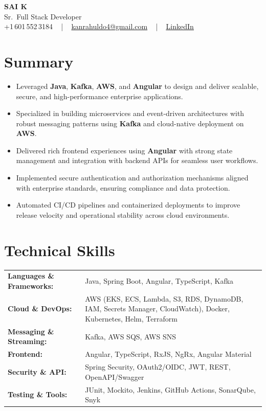 \documentclass[letterpaper,11pt]{article}
\newcommand{\resumeItem}[1]{
  \item\footnotesize{
    {#1 \vspace{-2pt}}
  }
}
\newcommand{\resumeItemListStart}{\begin{itemize}[leftmargin=*]}
\newcommand{\resumeItemListEnd}{\end{itemize}\vspace{-5pt}}
\begin{document}
\begin{center}
    {\fontsize{14pt}{12pt}\selectfont \textbf{\MakeUppercase{Sai K}}}\\ \vspace{2pt}
    \fontsize{10pt}{12pt}\selectfont Sr.\ Full Stack Developer\\ \vspace{2pt}
    \fontsize{10pt}{12pt}\selectfont +1\,601\,552\,3184 ~ | ~
    \href{mailto:kanrahuldo4@gmail.com}{kanrahuldo4@gmail.com} ~ | ~
    \href{https://www.linkedin.com/in/srrrk/}{\color{blue}\underline{LinkedIn}}
    \vspace{-10pt}
\end{center}

\section{Summary}
\fontsize{9pt}{10pt}\selectfont
\resumeItemListStart
  \resumeItem{Leveraged \textbf{Java}, \textbf{Kafka}, \textbf{AWS}, and \textbf{Angular} to design and deliver scalable, secure, and high-performance enterprise applications.}
  \resumeItem{Specialized in building microservices and event-driven architectures with robust messaging patterns using \textbf{Kafka} and cloud-native deployment on \textbf{AWS}.}
  \resumeItem{Delivered rich frontend experiences using \textbf{Angular} with strong state management and integration with backend APIs for seamless user workflows.}
  \resumeItem{Implemented secure authentication and authorization mechanisms aligned with enterprise standards, ensuring compliance and data protection.}
  \resumeItem{Automated CI/CD pipelines and containerized deployments to improve release velocity and operational stability across cloud environments.}
\resumeItemListEnd
\vspace{-6pt}

\section{Technical Skills}
\vspace{-14pt}
\begin{table}[h]
\fontsize{9pt}{10pt}\selectfont
\begin{tabular}{p{0.3\linewidth} p{0.7\linewidth}}
\textbf{Languages \& Frameworks:} & Java, Spring Boot, Angular, TypeScript, Kafka \\
\textbf{Cloud \& DevOps:} & AWS (EKS, ECS, Lambda, S3, RDS, DynamoDB, IAM, Secrets Manager, CloudWatch), Docker, Kubernetes, Helm, Terraform \\
\textbf{Messaging \& Streaming:} & Kafka, AWS SQS, AWS SNS \\
\textbf{Frontend:} & Angular, TypeScript, RxJS, NgRx, Angular Material \\
\textbf{Security \& API:} & Spring Security, OAuth2/OIDC, JWT, REST, OpenAPI/Swagger \\
\textbf{Testing \& Tools:} & JUnit, Mockito, Jenkins, GitHub Actions, SonarQube, Snyk \\
\end{tabular}
\end{table}
\vspace{-15pt}
\end{document}
